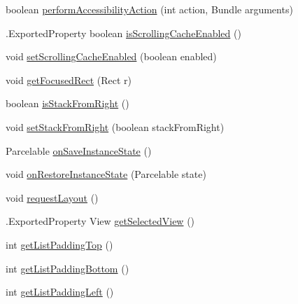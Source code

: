 \begin{DoxyCompactItemize}
\item 
boolean \hyperlink{classit_1_1sephiroth_1_1android_1_1library_1_1widget_1_1_abs_h_list_view_a771681b38fac57375224bc0898eb0567}{perform\+Accessibility\+Action} (int action, Bundle arguments)
\item 
.Exported\+Property boolean \hyperlink{classit_1_1sephiroth_1_1android_1_1library_1_1widget_1_1_abs_h_list_view_afdbd5760313bd2ac23b77d93955952f0}{is\+Scrolling\+Cache\+Enabled} ()
\item 
void \hyperlink{classit_1_1sephiroth_1_1android_1_1library_1_1widget_1_1_abs_h_list_view_ae0d33f428ee63d245cc85bc7a4616125}{set\+Scrolling\+Cache\+Enabled} (boolean enabled)
\item 
void \hyperlink{classit_1_1sephiroth_1_1android_1_1library_1_1widget_1_1_abs_h_list_view_a11c8e4a20014341902c5b2827180ff21}{get\+Focused\+Rect} (Rect r)
\item 
boolean \hyperlink{classit_1_1sephiroth_1_1android_1_1library_1_1widget_1_1_abs_h_list_view_a2c11ea6ae5c9fab59864dba4661f0329}{is\+Stack\+From\+Right} ()
\item 
void \hyperlink{classit_1_1sephiroth_1_1android_1_1library_1_1widget_1_1_abs_h_list_view_ac486e4a6157200a6ad86336441d84dce}{set\+Stack\+From\+Right} (boolean stack\+From\+Right)
\item 
Parcelable \hyperlink{classit_1_1sephiroth_1_1android_1_1library_1_1widget_1_1_abs_h_list_view_a94ef307f271d02352d77ec32abb28377}{on\+Save\+Instance\+State} ()
\item 
void \hyperlink{classit_1_1sephiroth_1_1android_1_1library_1_1widget_1_1_abs_h_list_view_a9b4cf5fb56754f833ff032c4eff3fdd6}{on\+Restore\+Instance\+State} (Parcelable state)
\item 
void \hyperlink{classit_1_1sephiroth_1_1android_1_1library_1_1widget_1_1_abs_h_list_view_a32cc2435be6c3f6729f4ecad8a7a8496}{request\+Layout} ()
\item 
.Exported\+Property View \hyperlink{classit_1_1sephiroth_1_1android_1_1library_1_1widget_1_1_abs_h_list_view_add012a21637de8d941149bc0993b37cf}{get\+Selected\+View} ()
\item 
int \hyperlink{classit_1_1sephiroth_1_1android_1_1library_1_1widget_1_1_abs_h_list_view_a4b84c2f0ea567f42658eeb195b47aa2a}{get\+List\+Padding\+Top} ()
\item 
int \hyperlink{classit_1_1sephiroth_1_1android_1_1library_1_1widget_1_1_abs_h_list_view_a3c14eacb1b7fa496c6ba6f94255becd2}{get\+List\+Padding\+Bottom} ()
\item 
int \hyperlink{classit_1_1sephiroth_1_1android_1_1library_1_1widget_1_1_abs_h_list_view_af4f34f293e6cc5bf85810c25797c3b53}{get\+List\+Padding\+Left} ()

\end{DoxyCompactItemize}
